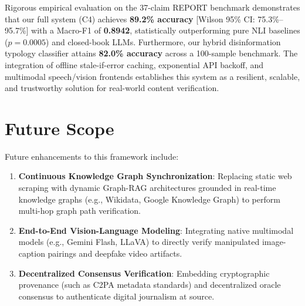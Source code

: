 \documentclass[12pt,a4paper]{report}
\begin{document}
Rigorous empirical evaluation on the 37-claim REPORT benchmark demonstrates that our full system (C4) achieves \textbf{89.2\% accuracy} [Wilson 95\% CI: 75.3\%--95.7\%] with a Macro-F1 of \textbf{0.8942}, statistically outperforming pure NLI baselines ($p = 0.0005$) and closed-book LLMs. Furthermore, our hybrid disinformation typology classifier attains \textbf{82.0\% accuracy} across a 100-sample benchmark. The integration of offline stale-if-error caching, exponential API backoff, and multimodal speech/vision frontends establishes this system as a resilient, scalable, and trustworthy solution for real-world content verification.

\section{Future Scope}
Future enhancements to this framework include:
\begin{enumerate}
    \item \textbf{Continuous Knowledge Graph Synchronization}: Replacing static web scraping with dynamic Graph-RAG architectures grounded in real-time knowledge graphs (e.g., Wikidata, Google Knowledge Graph) to perform multi-hop graph path verification.
    \item \textbf{End-to-End Vision-Language Modeling}: Integrating native multimodal models (e.g., Gemini Flash, LLaVA) to directly verify manipulated image-caption pairings and deepfake video artifacts.
    \item \textbf{Decentralized Consensus Verification}: Embedding cryptographic provenance (such as C2PA metadata standards) and decentralized oracle consensus to authenticate digital journalism at source.
\end{enumerate}
\end{document}

